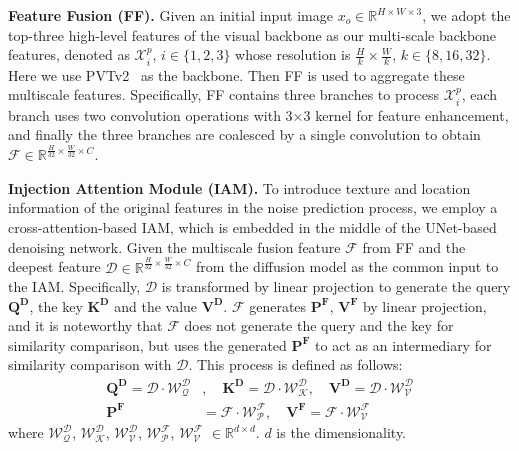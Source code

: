 \documentclass{ecai}
\begin{document}
\vspace{10pt}
\noindent\textbf{Feature Fusion (FF).}
Given an initial input image $x_{o} \in \mathbb{R}^{H\times W \times 3}$, we adopt the top-three high-level features of the visual backbone as our multi-scale backbone features, denoted as $\mathcal{X}^{p}_{i}$, $i \in \{1, 2, 3\}$ whose resolution is $\frac{H}{k} \times \frac{W}{k}$, $k \in \{8, 16, 32\}$. Here we use PVTv2~\cite{wang2021pvtv2} as the backbone. Then FF is used to aggregate these multiscale features. Specifically, FF contains three branches to process $\mathcal{X}^{p}_{i}$, each branch uses two convolution operations with 3$\times$3 kernel for feature enhancement, and finally the three branches are coalesced by a single convolution to obtain $\mathcal{F} \in \mathbb{R}^{\frac{H}{32} \times \frac{W}{32} \times C}$.

\vspace{10pt}
\noindent\textbf{Injection Attention Module (IAM).} To introduce texture and location information of the original features in the noise prediction process, we employ a cross-attention-based IAM, which is embedded in the middle of the UNet-based denoising network. Given the multiscale fusion feature $\mathcal{F}$ from FF and the deepest feature $\mathcal{D} \in \mathbb{R}^{\frac{H}{32} \times \frac{W}{32} \times C}$ from the diffusion model as the common input to the IAM. Specifically, $\mathcal{D}$ is transformed by linear projection to generate the query $\mathbf{Q^{D}}$, the key $\mathbf{K^{D}}$ and the value $\mathbf{V^{D}}$. $\mathcal{F}$ generates $\mathbf{P^{F}}$, $\mathbf{V^{F}}$ by linear projection, and it is noteworthy that $\mathcal{F}$ does not generate the query and the key for similarity comparison, but uses the generated $\mathbf{P^{F}}$ to act as an intermediary for similarity comparison with $\mathcal{D}$. This process is defined as follows:
\begin{equation}
    \begin{split}
        \mathbf{Q^{D}}=\mathcal{D} \cdot \mathcal{W_{Q}^{D}}&, \quad \mathbf{K^{D}}= \mathcal{D} \cdot \mathcal{W_{K}^{D}}, \quad  \mathbf{V^{D}}=\mathcal{D} \cdot \mathcal{W_{V}^{D}} \\
        \mathbf{P^{F}}&=\mathcal{F} \cdot \mathcal{W_{P}^{F}}, \quad \mathbf{V^{F}}= \mathcal{F} \cdot\mathcal{W_{V}^{F}}
    \end{split}
\end{equation}
where $\mathcal{W_{Q}^{D}}$, $\mathcal{W_{K}^{D}}$, $\mathcal{W_{V}^{D}}$, $\mathcal{W_{P}^{F}}$, $\mathcal{W_{V}^{F}}$ $\in \mathbb{R}^{d \times d}$. $d$ is the dimensionality.
\end{document}
